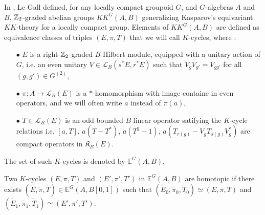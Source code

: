 In \cite{LeGall}, Le Gall defined, for any locally compact groupoid $G$, and $G$-algebras $A$ and $B$, $\mathbb Z_2$-graded abelian groups $KK^G(A,B)$ generalizing Kasparov's equivariant $KK$-theory for a locally compact group. Elements of $KK^G(A,B)$ are defined as equivalence classes of triples $(E,\pi,T)$ that we will call $K$-cycles, where :
\begin{itemize}
\item[$\bullet$] $E$ is a right $\mathbb Z_2$-graded $B$-Hilbert module, equipped with a unitary action of $G$, i.e. an even unitary $V\in\mathcal L_B(s^*E,r^*E)$ such that $V_g V_{g'} = V_{gg'}$ for all $(g,g')\in G^{(2)}$,
\item[$\bullet$] $\pi : A\rightarrow \mathcal L_B(E)$ is a $*$-homomorphism with image containe in even operators, and we will often write $a$ instead of $\pi(a)$,
\item[$\bullet$] $T\in\mathcal L_B(E)$ is an odd bounded $B$-linear operator satifying the $K$-cycle relations i.e. $[a, T]$, $a(T-T^*)$, $a(T^2-1)$, $a(T_{r(g)}-V_gT_{s(g)}V_g^*)$ are compact operators in $\mathfrak K_B(E)$.
\end{itemize} 

The set of such $K$-cycles is denoted by $\mathbb E^G(A,B)$.

\begin{definition}
Two $K$-cycles $(E,\pi,T)$ and $ (E',\pi',T')$ in $\mathbb E^G(A,B)$ are homotopic if there exists $ (\tilde E,\tilde \pi,\tilde T) \in\mathbb E^G(A,B[0,1])$ such that $(\tilde E_0,\tilde \pi_0,\tilde T_0)\simeq (E,\pi,T)$ and $(\tilde E_1,\tilde \pi_1,\tilde T_1)\simeq (E',\pi',T')$.
\end{definition}
